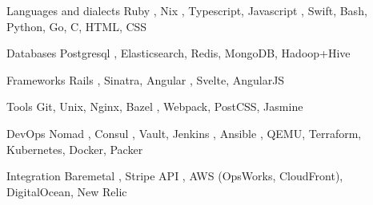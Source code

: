 
\begin{cvskills}

  \cvskill
    {Languages and dialects} %
    {Ruby \cvstar, Nix \cvstar, Typescript, Javascript \cvstar, Swift, Bash, Python, Go, C, HTML, CSS} %

  \cvskill
    {Databases} %
    {Postgresql \cvstar, Elasticsearch, Redis, MongoDB, Hadoop+Hive} %

  \cvskill
    {Frameworks} %
    {Rails \cvstar, Sinatra, Angular \cvstar, Svelte, AngularJS} %

  \cvskill
    {Tools} %
    {Git, Unix, Nginx, Bazel \cvstar, Webpack, PostCSS, Jasmine} %

  \cvskill
    {DevOps} %
    {Nomad \cvstar, Consul \cvstar, Vault, Jenkins \cvstar, Ansible \cvstar, QEMU, Terraform, Kubernetes, Docker, Packer} %


  \cvskill
    {Integration} %
    {Baremetal \cvstar, Stripe API \cvstar, AWS (OpsWorks, CloudFront), DigitalOcean, New Relic} %


\end{cvskills}
